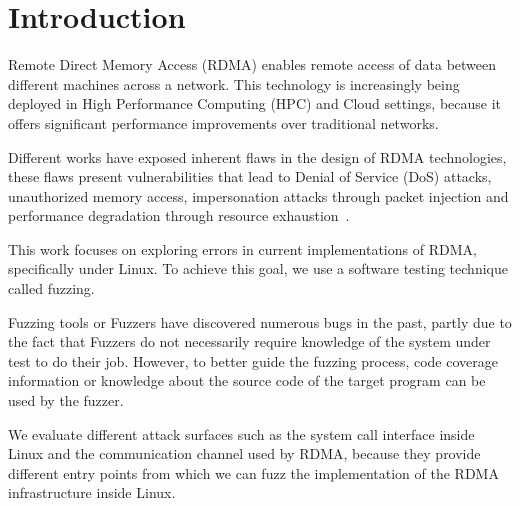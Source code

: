\section{Introduction}





Remote Direct Memory Access (RDMA) enables remote access of data between different machines across a network.
This technology is increasingly being deployed in High Performance Computing (HPC) and Cloud settings, because
it offers significant performance improvements over traditional networks.


Different works have exposed inherent flaws in the design of RDMA technologies, these flaws present
vulnerabilities that lead to Denial of Service (DoS) attacks, unauthorized memory access, impersonation
attacks through packet injection and performance degradation through resource
exhaustion~\cite{rothenbergerReDMArkBypassingRDMA2021}\cite{tsaiDoubleEdgedSwordSecurity2019}.

This work focuses on exploring errors in current implementations of RDMA, specifically under Linux.
To achieve this goal, we use a software testing technique called fuzzing.

Fuzzing tools or Fuzzers have discovered numerous bugs in the past, partly due to the fact
that Fuzzers do not necessarily require knowledge of the system under test to do their job. However, to better guide
the fuzzing process, code coverage information or knowledge about the source code of the target program can be used by the fuzzer.

We evaluate different attack surfaces such as the system call interface inside Linux and the
communication channel used by RDMA, because they provide different entry points from which
we can fuzz the implementation of the RDMA infrastructure inside Linux.

